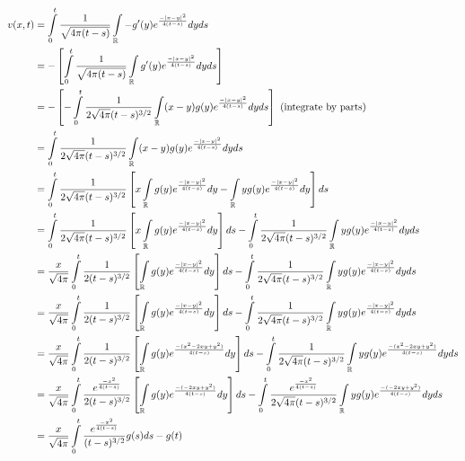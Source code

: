 \documentclass[a4paper,12pt]{article}
\begin{document}
\begin{align*}
v(x,t) &= \int\limits_0^t \frac{1}{\sqrt{4 \pi (t-s)}} \int\limits_{\mathbb{R}} -g'(y) e^{\frac{-\left\lvert x-y \right\rvert^2}{4(t-s)}} dy ds\\
&= -\left[\int\limits_0^t \frac{1}{\sqrt{4 \pi (t-s)}} \int\limits_{\mathbb{R}} g'(y) e^{\frac{-\left\lvert x-y \right\rvert^2}{4(t-s)}} dy ds \right]\\
&= -\left[ -  \int\limits_0^t \frac{1}{2\sqrt{4 \pi }(t-s)^{3/2}} \int\limits_{\mathbb{R}} (x-y)g(y) e^{\frac{-\left\lvert x-y \right\rvert^2}{4(t-s)}} dy ds \right] \text{ (integrate by parts)}\\
&= \int\limits_0^t \frac{1}{2\sqrt{4 \pi }(t-s)^{3/2}} \int\limits_{\mathbb{R}} (x-y)g(y) e^{\frac{-\left\lvert x-y \right\rvert^2}{4(t-s)}} dy ds \\
&= \int\limits_0^t \frac{1}{2\sqrt{4 \pi }(t-s)^{3/2}} \left[x\int\limits_{\mathbb{R}} g(y) e^{\frac{-\left\lvert x-y \right\rvert^2}{4(t-s)}}dy - \int\limits_{\mathbb{R}} yg(y) e^{\frac{-\left\lvert x-y \right\rvert^2}{4(t-s)}} dy \right] ds \\
&= \int\limits_0^t \frac{1}{2\sqrt{4 \pi }(t-s)^{3/2}} \left[x\int\limits_{\mathbb{R}} g(y) e^{\frac{-\left\lvert x-y \right\rvert^2}{4(t-s)}}dy \right] ds - \int\limits_0^t \frac{1}{2\sqrt{4 \pi }(t-s)^{3/2}} \int\limits_{\mathbb{R}} yg(y) e^{\frac{-\left\lvert x-y \right\rvert^2}{4(t-s)}} dy ds \\
&= \frac{x}{\sqrt{4\pi}} \int\limits_0^t \frac{1}{2(t-s)^{3/2}} \left[\int\limits_{\mathbb{R}} g(y) e^{\frac{-\left\lvert x-y \right\rvert^2}{4(t-s)}}dy \right] ds - \int\limits_0^t \frac{1}{2\sqrt{4 \pi }(t-s)^{3/2}} \int\limits_{\mathbb{R}} yg(y) e^{\frac{-\left\lvert x-y \right\rvert^2}{4(t-s)}} dy ds \\
&= \frac{x}{\sqrt{4\pi}} \int\limits_0^t \frac{1}{2(t-s)^{3/2}} \left[\int\limits_{\mathbb{R}} g(y) e^{\frac{-\left\lvert x-y \right\rvert^2}{4(t-s)}}dy \right] ds - \int\limits_0^t \frac{1}{2\sqrt{4 \pi }(t-s)^{3/2}} \int\limits_{\mathbb{R}} yg(y) e^{\frac{-\left\lvert x-y \right\rvert^2}{4(t-s)}} dy ds \\
&= \frac{x}{\sqrt{4\pi}} \int\limits_0^t \frac{1}{2(t-s)^{3/2}} \left[\int\limits_{\mathbb{R}} g(y) e^{\frac{-(x^2-2xy+y^2)}{4(t-s)}}dy \right] ds - \int\limits_0^t \frac{1}{2\sqrt{4 \pi }(t-s)^{3/2}} \int\limits_{\mathbb{R}} yg(y) e^{\frac{-(x^2-2xy+y^2)}{4(t-s)}} dy ds \\
&= \frac{x}{\sqrt{4\pi}} \int\limits_0^t \frac{e^{\frac{-x^2}{4(t-s)}}}{2(t-s)^{3/2}} \left[\int\limits_{\mathbb{R}} g(y) e^{\frac{-(-2xy+y^2)}{4(t-s)}}dy \right] ds - \int\limits_0^t \frac{e^{\frac{-x^2}{4(t-s)}}}{2\sqrt{4 \pi }(t-s)^{3/2}} \int\limits_{\mathbb{R}} yg(y) e^{\frac{-(-2xy+y^2)}{4(t-s)}} dy ds \\
&= \frac{x}{\sqrt{4\pi}} \int\limits_0^t \frac{e^{\frac{-x^2}{4(t-s)}}}{(t-s)^{3/2}} g(s) ds - g(t) \\
\end{align*}
\end{document}
